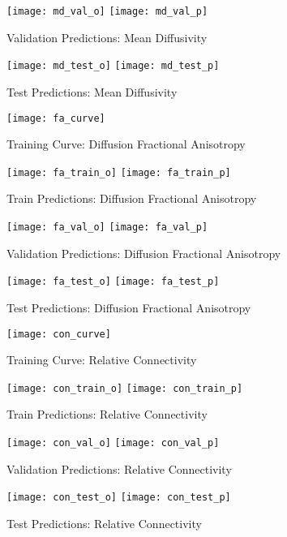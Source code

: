 \begin{figure}[H]
\centering
\texttt{[image: md\_val\_o]}
\texttt{[image: md\_val\_p]}
\caption{Validation Predictions: Mean Diffusivity}
\label{fig:pred-val-md}
\end{figure}

\begin{figure}[H]
\centering
\texttt{[image: md\_test\_o]}
\texttt{[image: md\_test\_p]}
\caption{Test Predictions: Mean Diffusivity}
\label{fig:pred-tes-md}
\end{figure}

\begin{figure}[H]
\centering
\texttt{[image: fa\_curve]}
\caption{Training Curve: Diffusion Fractional Anisotropy}
\label{fig:curve-fa}
\end{figure}

\begin{figure}[H]
\centering
\texttt{[image: fa\_train\_o]}
\texttt{[image: fa\_train\_p]}
\caption{Train Predictions: Diffusion Fractional Anisotropy}
\label{fig:pred-tra-fa}
\end{figure}

\begin{figure}[H]
\centering
\texttt{[image: fa\_val\_o]}
\texttt{[image: fa\_val\_p]}
\caption{Validation Predictions: Diffusion Fractional Anisotropy}
\label{fig:pred-val-fa}
\end{figure}

\begin{figure}[H]
\centering
\texttt{[image: fa\_test\_o]}
\texttt{[image: fa\_test\_p]}
\caption{Test Predictions: Diffusion Fractional Anisotropy}
\label{fig:pred-tes-fa}
\end{figure}

\begin{figure}[H]
\centering
\texttt{[image: con\_curve]}
\caption{Training Curve: Relative Connectivity}
\label{fig:curve-con}
\end{figure}

\begin{figure}[H]
\centering
\texttt{[image: con\_train\_o]}
\texttt{[image: con\_train\_p]}
\caption{Train Predictions: Relative Connectivity}
\label{fig:pred-tra-con}
\end{figure}

\begin{figure}[H]
\centering
\texttt{[image: con\_val\_o]}
\texttt{[image: con\_val\_p]}
\caption{Validation Predictions: Relative Connectivity}
\label{fig:pred-val-con}
\end{figure}

\begin{figure}[H]
\centering
\texttt{[image: con\_test\_o]}
\texttt{[image: con\_test\_p]}
\caption{Test Predictions: Relative Connectivity}
\label{fig:pred-tes-con}
\end{figure}


